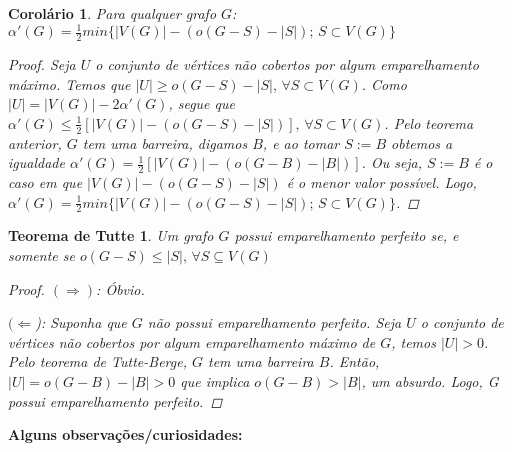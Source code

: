 \documentclass[a4paper,12pt]{article}
\newtheorem*{6}{Corolário}
\newtheorem*{7}{Teorema de Tutte}
\begin{document}
\begin{6}

Para qualquer grafo $G$: \center $\alpha'(G) = \frac{1}{2} min\{ |V(G)| - (o(G - S) - |S|);\, S \subset V(G)\}$

\begin{proof}

Seja $U$ o conjunto de vértices não cobertos por algum emparelhamento máximo. Temos que $|U| \geq o(G - S) - |S|,\, \forall S \subset V(G)$. Como $|U| = |V(G)| -2\alpha'(G)$, segue que $\alpha'(G) \leq \frac{1}{2} [|V(G)| - (o(G - S) - |S|)],\, \forall S \subset V(G)$. Pelo teorema anterior, $G$ tem uma barreira, digamos $B$, e ao tomar $S := B$ obtemos a igualdade $\alpha'(G) = \frac{1}{2} [|V(G)| - (o(G - B) - |B|)]$. Ou seja, $S := B$ é o caso em que $|V(G)| - (o(G - S) - |S|)$ é o menor valor possível. Logo, $\alpha'(G) = \frac{1}{2} min\{ |V(G)| - (o(G - S) - |S|);\, S \subset V(G)\}$.

\end{proof}

\end{6}

\begin{7}

Um grafo $G$ possui emparelhamento perfeito se, e somente se \center $o(G-S) \leq |S|,\, \forall S \subseteq V(G)$

\begin{proof}

$(\Longrightarrow)$: Óbvio.

$(\Longleftarrow$): Suponha que $G$ não possui emparelhamento perfeito. Seja $U$ o conjunto de vértices não cobertos por algum emparelhamento máximo de $G$, temos $|U| > 0$. Pelo teorema de Tutte-Berge, $G$ tem uma barreira $B$. Então, $|U| = o(G-B) - |B| > 0$ que implica $o(G-B) > |B|$, um absurdo. Logo, G possui emparelhamento perfeito.

\end{proof}

\end{7}

\noindent \textbf{Alguns observações/curiosidades:}
\end{document}
